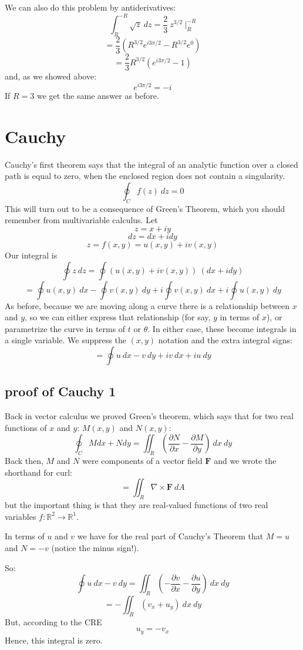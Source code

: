 \documentclass[11pt, oneside]{article}   	%
\begin{document}
We can also do this problem by antiderivatives:
\[ \int_R^{-R} \sqrt{z} \ dz = \frac{2}{3} \ z^{3/2} \ \bigg |_R^{-R}  \]
\[ = \frac{2}{3} ( R^{3/2} e^{i3\pi/2} - R^{3/2} e^0) \]
\[ = \frac{2}{3} R^{3/2} ( e^{i3\pi/2} - 1) \]
and, as we showed above:
\[ e^{i3\pi/2} = -i \]
If $R=3$ we get the same answer as before.

\section{Cauchy}
Cauchy's first theorem says that the integral of an analytic function over a closed path is equal to zero, when the enclosed region does not contain a singularity.
\[ \oint_C f(z) \ dz = 0 \]
This will turn out to be a consequence of Green's Theorem, which you should remember from multivariable calculus.  Let
\[ z = x + i y \]
\[ dz = dx + i dy \]
\[ z = f(x,y) = u(x,y) + iv(x,y) \]
Our integral is
\[ \oint z \ dz = \oint (u(x,y) + iv(x,y)) \ (dx + i dy) \]
\[ =  \oint u(x,y) \ dx - \oint v(x,y) \ dy + i \oint v(x,y) \ dx + i \oint u(x,y) \ dy \]
As before, because we are moving along a curve there is a relationship between $x$ and $y$, so we can either express that relationship (for say, $y$ in terms of $x$), or parametrize the curve in terms of $t$ or $\theta$.  In either case, these become integrals in a single variable.  We suppress the $(x,y)$ notation and the extra integral signs:
\[ =  \oint u \ dx - v \ dy + i v \ dx + i u \ dy \]

\subsection*{proof of Cauchy 1}
Back in vector calculus we proved Green's theorem, which says that for two real functions of $x$ and $y$:  $M(x,y)$ and $N(x,y)$:
\[ \oint_C M dx + N dy = \iint_R (\frac{\partial N}{\partial x} - \frac{\partial M}{\partial y}) \ dx \ dy \]
Back then, $M$ and $N$ were components of a vector field $\mathbf{F}$ and we wrote the shorthand for curl:
\[ = \iint_R \nabla \times \mathbf{F} \ dA\]
but the important thing is that they are real-valued functions of two real variables $f: \mathbb{R}^2 \rightarrow \mathbb{R}^1$.

In terms of $u$ and $v$ we have for the real part of Cauchy's Theorem that $M=u$ and $N = -v$ (notice the minus sign!).  

So:
\[ \oint u \ dx - v \ dy = \iint_R (-\frac{\partial v}{\partial x} -  \frac{\partial u}{\partial y}) \ dx \ dy \]
\[ = - \iint_R (v_x + u_y) \ dx \ dy \]
But, according to the CRE
\[ u_y = -v_x \]
Hence, this integral is zero.
\end{document}
